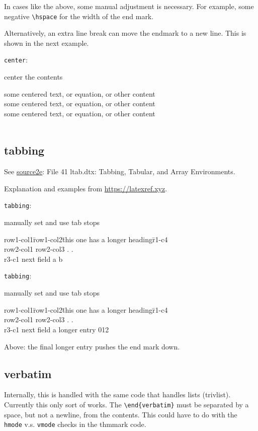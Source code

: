 \documentclass[leqno]{article}
\newcommand{\testtype}[2]{\texttt{#1}:%
  #2}
\newcommand{\makeoutertest}[3]{
  \begin{test}
    \testtype{#1}{#2}
    #3
  \end{test}
}
\newcommand{\maketest}[3]{
  \makeoutertest{#1}{#2}{
    \begin{#1}
      #3
    \end{#1}
  }
}
\begin{document}
In cases like the above, some manual adjustment is necessary.
For example, some negative \verb|\hspace| for the width of the end mark.

Alternatively, an extra line break can move the endmark to a new line.
This is shown in the next example.
\maketest{center}{
  center the contents
}{
  some centered text, or equation, or other content\\
  some centered text, or equation, or other content\\
  some centered text, or equation, or other content\\~ %
}

\subsection{tabbing}

See \href{https://mirrors.ctan.org/macros/latex/base/source2e.pdf}{source2e}: File 41 ltab.dtx: Tabbing, Tabular, and Array Environments.

Explanation and examples from \url{https://latexref.xyz}.

\maketest{tabbing}{
  manually set and use tab stops
}{
  row1-col1\qquad \= row1-col2\qquad \= this one has a longer heading\qquad \= r1-c4 \\
  row2-col1 \> row2-col3  \> . \> . \\
  r3-c1 \> next field \> a \> b
}
\maketest{tabbing}{
  manually set and use tab stops
}{
  row1-col1\qquad \= row1-col2\qquad \= this one has a longer heading\qquad \= r1-c4 \\
  row2-col1 \> row2-col3  \> . \> . \\
  r3-c1 \> next field \> a \> longer entry 012
}
Above: the final longer entry pushes the end mark down.

\subsection{verbatim}

Internally, this is handled with the same code that handles lists (trivlist).
Currently this only sort of works.
The \verb|\end{verbatim}| must be separated by a space, but not a newline, from the contents.
This could have to do with the \texttt{hmode} v.s. \texttt{vmode} checks in the thmmark code.

\end{document}
